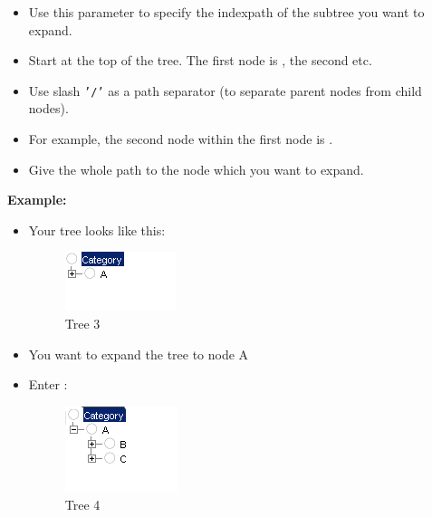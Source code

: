 \begin{itemize}
\item Use this parameter to specify the indexpath of the subtree you want to expand.
\item Start at the top of the tree. The first node is , the second  etc.
\item Use slash {\tt '/'} as a path separator (to separate parent nodes from child nodes).
\item For example, the second node within the first node is . 
\item Give the whole path to the node which you want to expand.
\end{itemize}

\textbf{Example:}

\begin{itemize}
\item Your tree looks like this:

\begin{figure}
\begin{center}
\includegraphics{PS/Treeexample3}
\caption{Tree 3}
\label{treeexample3}
\end{center}
\end{figure}

\item You want to expand the tree to node A
\item Enter :

\begin{figure}
\begin{center}
\includegraphics{PS/Treeexample4}
\caption{Tree 4}
\label{treeexample4}
\end{center}
\end{figure}
\end{itemize}
